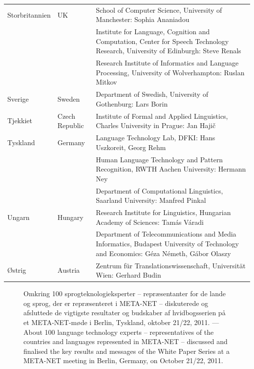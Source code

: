 \begin{longtable}{llp{105mm}}
  Storbritannien & \textcolor{grey1}{UK} & School of Computer Science, University of Manchester: Sophia Ananiadou \\ \addlinespace 
  & & Institute for Language, Cognition and Computation, Center for Speech Technology Research, University of Edinburgh: Steve Renals \\ \addlinespace 
  & & Research Institute of Informatics and Language Processing, University of Wolverhampton: Ruslan Mitkov \\ \addlinespace
   
Sverige & \textcolor{grey1}{Sweden} & Department of Swedish, University of Gothenburg: Lars Borin \\ \addlinespace

  Tjekkiet & \textcolor{grey1}{Czech Republic} & Institute of Formal and Applied Linguistics, Charles University in Prague: Jan Hajič \\ \addlinespace
  
 Tyskland & \textcolor{grey1}{Germany} & Language Technology Lab, DFKI: Hans Uszkoreit, Georg Rehm\\ \addlinespace
  & & Human Language Technology and Pattern Recognition, RWTH Aachen University: Hermann Ney \\ \addlinespace
  & & Department of Computational Linguistics, Saarland University: Manfred Pinkal\\ \addlinespace 
  
  Ungarn & \textcolor{grey1}{Hungary} & Research Institute for Linguistics, Hungarian Academy of Sciences: Tamás Váradi\\  \addlinespace
  & & Department of Telecommunications and Media Informatics, Budapest University of Technology and Economics: Géza Németh, Gábor Olaszy\\ \addlinespace
  
  \O strig & \textcolor{grey1}{Austria} & Zentrum für Translationswissenschaft, Universität Wien: Gerhard Budin
\end{longtable}
\normalsize

\renewcommand*{\figureformat}{}
\renewcommand*{\captionformat}{}

\begin{figure}[htbp]
  \center
  \caption{Omkring 100 sprogteknologieksperter -- repr\ae sentanter for de lande og sprog, der er repr\ae senteret i META-NET -- diskuterede og afsluttede de vigtigste resultater og budskaber af hvidbogsserien \mbox{p\aa} et META-NET-m\o de i Berlin, Tyskland, oktober 21/22, 2011. --- \textcolor{grey1}{About 100 language technology experts -- representatives of the countries and languages represented in META-NET -- discussed and finalised the key results and messages of the White Paper Series at a META-NET meeting in Berlin, Germany, on October 21/22, 2011.}}
\medskip
\end{figure}

